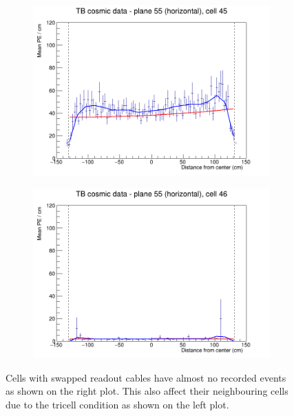 \documentclass[12pt,a4paper]{article}
\begin{document}
\begin{figure}[h]
  \begin{subfigure}{0.5\textwidth}
    \includegraphics[width=\linewidth]{RelativeCalibrationResults/p2_055_045.png}
  \end{subfigure}
  \begin{subfigure}{0.5\textwidth}
    \includegraphics[width=\linewidth]{RelativeCalibrationResults/p2_055_046.png}
  \end{subfigure}
  \caption{Cells with swapped readout cables have almost no recorded events as shown on the right plot. This also affect their neighbouring cells due to the tricell condition as shown on the left plot.}
  \label{figAttenfitResultsPerio2_SwappedCables}
\end{figure}
\end{document}
